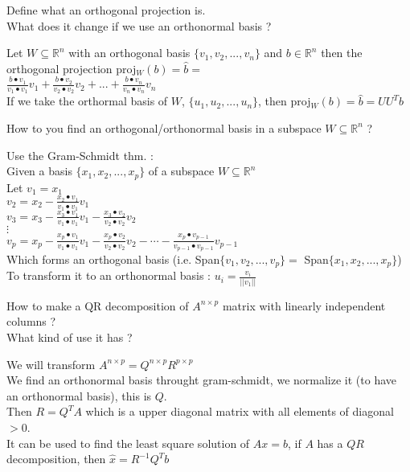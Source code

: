 \documentclass[12pt]{article}
\newcommand*{\xfield}[1]{\begin{mdframed}\centering #1\end{mdframed}\bigskip}
\newenvironment{note}{}{}
\begin{document}
\begin{note}
	\xfield{Define what an orthogonal projection is.\\
	What does it change if we use an orthonormal basis ?}
	\xfield{Let $W \subseteq \mathbb{R}^n$ with an orthogonal basis $\{v_1,v_2,...,v_n\}$ and $b \in \mathbb{R}^n$ then the orthogonal projection proj$_W(b) = \hat{b} =$\\
	$\frac{b\bullet v_1}{v_1 \bullet v_1} v_1 + \frac{b\bullet v_2}{v_2 \bullet v_2} v_2 + ... + \frac{b\bullet v_n}{v_n \bullet v_n} v_n $\\
	If we take the orthormal basis of $W$, $\{u_1,u_2,...,u_n\}$, then proj$_W(b) = \hat{b} = UU^Tb$}
\end{note}

\begin{note}
	\xfield{How to you find an orthogonal/orthonormal basis in a subspace $W \subseteq \mathbb{R}^n$ ?}
	\xfield{Use the Gram-Schmidt thm. :\\
	Given a basis $\{x_1,x_2,...,x_p\}$ of a subspace $W \subseteq \mathbb{R}^n$\\
	Let $v_1 = x_1$\\
	$v_2 = x_2 - \frac{x_2 \bullet v_1}{v_1\bullet v_1}v_1$\\
	$v_3 = x_3 - \frac{x_3 \bullet v_1}{v_1\bullet v_1}v_1- \frac{x_3 \bullet v_2}{v_2\bullet v_2}v_2$\\
	$\vdots$\\
	$v_p = x_p -\frac{x_p \bullet v_1}{v_1\bullet v_1}v_1 - \frac{x_p \bullet v_2}{v_2\bullet v_2}v_2- \cdots -\frac{x_p \bullet v_{p-1}}{v_{p-1}\bullet v_{p-1}}v_{p-1}$\\
	Which forms an orthogonal basis (i.e. Span$\{v_1,v_2,...,v_p\} =$ Span$\{x_1,x_2,...,x_p\}$)\\
	To transform it to an orthonormal basis : $u_i = \frac{v_i}{\vert \vert v_1 \vert \vert}$}
\end{note}

\begin{note}
	\xfield{How to make a QR decomposition of $A^{n\times p}$ matrix with linearly independent columns ?\\
	What kind of use it has ?}
	\xfield{We will transform $A^{n\times p} = Q^{n\times p} R^{p\times p}$\\
	We find an orthonormal basis throught gram-schmidt, we normalize it (to have an orthonormal basis), this is $Q$.\\
	Then $R=Q^TA$ which is a upper diagonal matrix with all elements of diagonal $>0$.\\
	It can be used to find the least square solution of $Ax=b$, if $A$ has a $QR$ decomposition, then $\hat{x} = R^{-1}Q^Tb$}
\end{note}
\end{document}
